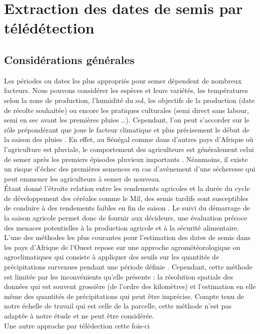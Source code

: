 \section{Extraction des dates de semis par télédétection}
  
  \subsection{Considérations générales} \label{sec-general}
  
Les périodes ou dates les plus appropriés pour semer dépendent de nombreux facteurs.  Nous pouvons considérer les espèces et leurs variétés, les températures 
selon la zone de production, l'humidité du sol, les objectifs de la production (date de récolte souhaitée) ou encore les pratiques culturales (semi direct sans labour, semi en sec avant les premières pluies \ldots{}). Cependant, l'on peut
s'accorder sur le rôle prépondérant que joue le facteur climatique et plus précisement le début de la saison des pluies \citep{Ingram2002, Barbier2009}. En effet, au Sénégal comme dans d'autres pays d'Afrique où l'agriculture est pluviale, le comportement des agriculteurs est
généralement celui de semer après les premiers épisodes pluvieux importants \citep{Bacci1999}. Néanmoins, il existe un risque d'échec des premières semences en cas d'avènement d'une sécheresse \citep{Marteau2011} qui peut emmener les agriculteurs à semer de nouveau.\\ \'Etant donné l'étroite relation entre les rendements agricoles et la durée du cycle de développement des céréales comme le Mil, 
des semis tardifs sont susceptibles de 
conduire à des rendements faibles en fin de saison \citep{Sivakumar1990}. Le suivi du démarrage de la saison agricole permet donc de fournir aux décideurs, une évaluation précoce des menaces potentielles 
à la production agricole et à la sécurité alimentaire. L'une des méthodes les plus courantes pour l'estimation des dates de semis dans les pays d'Afrique de l'Ouest repose sur une approche agrométéorologique ou agroclimatiques
qui consiste à appliquer des seuils sur les quantités de précipitations survenues pendant une période définie \citep{Marinho2014}. Cependant, cette méthode est limitée par les inconvénients qu'elle présente : la résolution spatiale des données qui est souvent grossière (de l'ordre des kilomètres) et l'estimation en elle même des quantités de précipitations qui peut être imprécise. 
Compte tenu de notre échelle de travail qui est celle de la parcelle, cette méthode n'est pas adaptée à notre étude et ne peut être considérée. \\Une autre approche par télédection cette fois-ci
